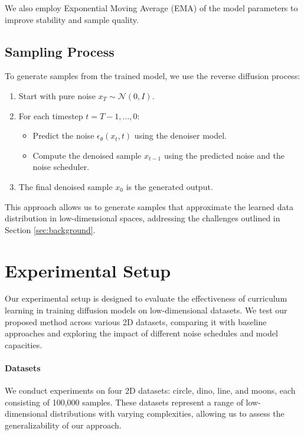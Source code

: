 \documentclass{article} %
\begin{document}
We also employ Exponential Moving Average (EMA) of the model parameters to improve stability and sample quality.

\subsection{Sampling Process}
To generate samples from the trained model, we use the reverse diffusion process:

\begin{enumerate}
    \item Start with pure noise $x_T \sim \mathcal{N}(0, I)$.
    \item For each timestep $t = T-1, \ldots, 0$:
        \begin{itemize}
            \item Predict the noise $\epsilon_\theta(x_t, t)$ using the denoiser model.
            \item Compute the denoised sample $x_{t-1}$ using the predicted noise and the noise scheduler.
        \end{itemize}
    \item The final denoised sample $x_0$ is the generated output.
\end{enumerate}

This approach allows us to generate samples that approximate the learned data distribution in low-dimensional spaces, addressing the challenges outlined in Section \ref{sec:background}.

\section{Experimental Setup}
\label{sec:experimental}

Our experimental setup is designed to evaluate the effectiveness of curriculum learning in training diffusion models on low-dimensional datasets. We test our proposed method across various 2D datasets, comparing it with baseline approaches and exploring the impact of different noise schedules and model capacities.

\paragraph{Datasets} We conduct experiments on four 2D datasets: circle, dino, line, and moons, each consisting of 100,000 samples. These datasets represent a range of low-dimensional distributions with varying complexities, allowing us to assess the generalizability of our approach.
\end{document}
